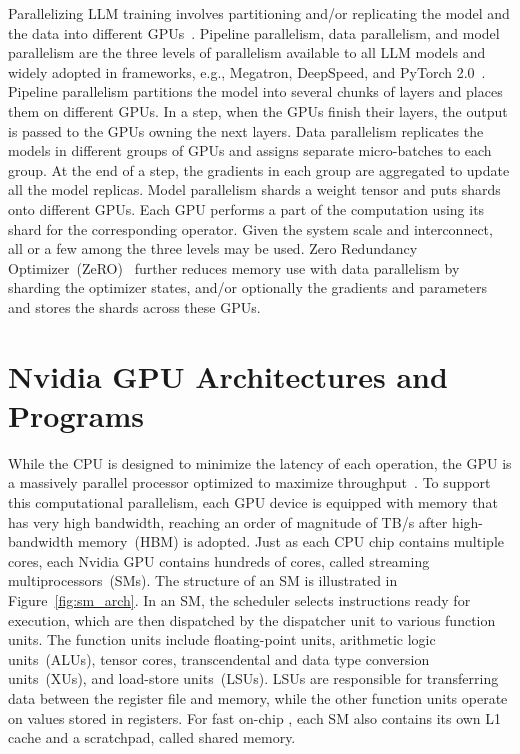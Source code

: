Parallelizing LLM training involves partitioning and/or replicating the model and the data into different GPUs~\cite{xuGSPMDGeneralScalable2021}. Pipeline parallelism, data parallelism, and model parallelism are the three levels of parallelism available to all LLM models and widely adopted in frameworks, e.g., Megatron, DeepSpeed, and PyTorch 2.0~\cite{shoeybiMegatronLMTrainingMultiBillion2020a,rasleyDeepSpeedSystemOptimizations2020,anselPyTorchFasterMachine2024}.
Pipeline parallelism partitions the model into several chunks of layers and places them on different GPUs. In a step, when the GPUs finish their layers, the output is passed to the GPUs owning the next layers.
Data parallelism replicates the models in different groups of GPUs and assigns separate micro-batches to each group.
At the end of a step, the gradients in each group are aggregated to update all the model replicas.
Model parallelism shards a weight tensor and puts shards onto different GPUs. Each GPU performs a part of the computation using its shard for the corresponding operator.
Given the system scale and interconnect, all or a few among the three levels may be used.
Zero Redundancy Optimizer~(ZeRO)~\cite{rajbhandariZeROMemoryOptimizations2020a} further reduces memory use with data parallelism by sharding the optimizer states, and/or optionally the gradients and parameters and stores the shards across these GPUs.


\section{Nvidia GPU Architectures and Programs}
\label{sec:bg_cuda}

While the CPU is designed to minimize the latency of each operation, the GPU is a massively parallel processor optimized to maximize throughput~\cite{PMPP4}. To support this computational parallelism, each GPU device is equipped with memory that has very high bandwidth, reaching an order of magnitude of TB/s after high-bandwidth memory~(HBM) is adopted. Just as each CPU chip contains multiple cores, each Nvidia GPU contains hundreds of cores, called streaming multiprocessors~(SMs). The structure of an SM is illustrated in Figure~\ref{fig:sm_arch}. In an SM, the scheduler selects instructions ready for execution, which are then dispatched by the dispatcher unit to various function units. The function units include floating-point units, arithmetic logic units~(ALUs), tensor cores, transcendental and data type conversion units~(XUs), and load-store units~(LSUs). LSUs are responsible for transferring data between the register file and memory, while the other function units operate on values stored in registers. For fast on-chip , each SM also contains its own L1 cache and a scratchpad, called shared memory.


